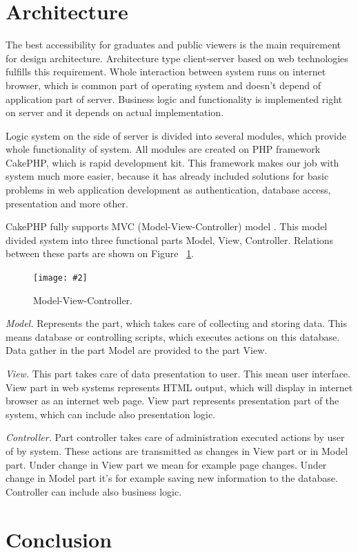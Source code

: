 \documentclass{iitsrc}[2006/14/02]
\newcommand\fig[4]{%
	\begin{figure}[h]
	\begin{center}
	\texttt{[image: \#2]}
	~\\%
	\caption{#4}
	\label{#3}
	\end{center}
	\end{figure}
}
\begin{document}
\section{Architecture}

The best accessibility for graduates and public viewers is the main requirement for design architecture. Architecture type client-server based on web technologies fulfills this requirement. Whole interaction between system runs on internet browser, which is common part of operating system and doesn’t depend of application part of server. Business logic and functionality is implemented right on server and it depends on actual implementation.

Logic system on the side of server is divided into several modules, which provide whole functionality of system. All modules are created on PHP framework CakePHP,  which is rapid development kit. This framework makes our job with system much more easier, because it has already included solutions for basic problems in web application development as authentication, database access, presentation and more other.

CakePHP fully supports MVC (Model-View-Controller) model \cite{cakephp}. This model divided system into three functional parts Model, View, Controller. Relations between these parts are shown on Figure ~\ref{fig:mvc}. 

\fig{width=7cm}{images/mvc}{fig:mvc}{Model-View-Controller.}

{\em Model.} Represents the part, which takes care of collecting and storing data. This means database or controlling scripts, which executes actions on this database. Data gather in the part Model are provided to the part View.

{\em View.} This part takes care of data presentation to user. This mean user interface.  View part in web systems represents HTML output, which will display in internet browser as an internet web page. View part represents presentation part of the system, which can include also presentation logic.

{\em Controller.} Part controller takes care of administration executed actions by user of by system. These actions are transmitted as changes in View part or in Model part. Under change in View part we mean for example page changes. Under change in Model part it’s for example saving new information to the database. Controller can include also business logic.
      
\section{Conclusion}
\end{document}
